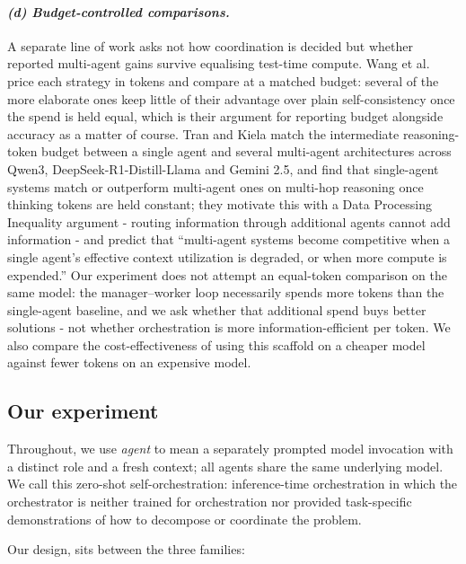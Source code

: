 \documentclass[11pt]{article}
\begin{document}
\paragraph{\textit{(d) Budget-controlled comparisons.}}
A separate line of work asks not how coordination is decided but whether reported
multi-agent gains survive equalising test-time compute. Wang et al.\ \cite{wangj2024b}
price each strategy in tokens and compare at a matched budget: several of the more
elaborate ones keep little of their advantage over plain self-consistency once the spend
is held equal, which is their argument for reporting budget alongside accuracy as a matter
of course. Tran and Kiela \cite{tran2026}
match the intermediate reasoning-token budget between a single agent and
several multi-agent architectures across Qwen3, DeepSeek-R1-Distill-Llama and Gemini 2.5,
and find that single-agent systems match or outperform multi-agent ones on multi-hop
reasoning once thinking tokens are held constant; they motivate this with a Data
Processing Inequality argument - routing information through additional agents cannot
add information - and predict that ``multi-agent systems become competitive when a
single agent's effective context utilization is degraded, or when more compute is
expended.'' Our experiment does not attempt an equal-token comparison on the same model: the
manager--worker loop necessarily spends more tokens than the single-agent baseline, and we
ask whether that additional spend buys better solutions - not whether orchestration is
more information-efficient per token. We also compare the cost-effectiveness of using this scaffold on a cheaper model against fewer tokens on an expensive model.

\subsection{Our experiment}

Throughout, we use \textit{agent} to mean a separately prompted model invocation with a
distinct role and a fresh context; all agents share the same underlying model. We call this 
zero-shot self-orchestration: inference-time orchestration in which the orchestrator is 
neither trained for orchestration nor provided task-specific demonstrations of how to 
decompose or coordinate the problem.

Our design, sits between the three families:
\end{document}
